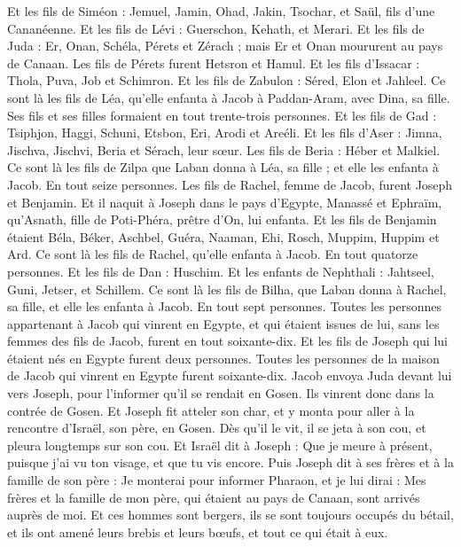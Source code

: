 \begin{multicols}{2}
Et les fils de Siméon : Jemuel, Jamin, Ohad, Jakin, Tsochar, et Saül, fils d'une Cananéenne.
Et les fils de Lévi : Guerschon, Kehath, et Merari.
Et les fils de Juda : Er, Onan, Schéla, Pérets et Zérach ; mais Er et Onan moururent au pays de Canaan. Les fils de Pérets furent Hetsron et Hamul.
Et les fils d'Issacar : Thola, Puva, Job et Schimron.
Et les fils de Zabulon : Séred, Elon et Jahleel.
Ce sont là les fils de Léa, qu'elle enfanta à Jacob à Paddan-Aram, avec Dina, sa fille. Ses fils et ses filles formaient en tout trente-trois personnes.
Et les fils de Gad : Tsiphjon, Haggi, Schuni, Etsbon, Eri, Arodi et Areéli.
Et les fils d'Aser : Jimna, Jischva, Jischvi, Beria et Sérach, leur sœur. Les fils de Beria : Héber et Malkiel.
Ce sont là les fils de Zilpa que Laban donna à Léa, sa fille ; et elle les enfanta à Jacob. En tout seize personnes.
Les fils de Rachel, femme de Jacob, furent Joseph et Benjamin.
Et il naquit à Joseph dans le  pays d'Egypte, Manassé et Ephraïm, qu'Asnath, fille de Poti-Phéra, prêtre d'On, lui enfanta.
Et les fils de Benjamin étaient Béla, Béker, Aschbel, Guéra, Naaman, Ehi, Rosch, Muppim, Huppim et Ard.
Ce sont là les fils de Rachel, qu'elle enfanta à Jacob. En tout quatorze personnes.
Et les fils de Dan : Huschim.
Et les enfants de Nephthali : Jahtseel, Guni, Jetser, et Schillem.
Ce sont là les fils de Bilha, que Laban donna à Rachel, sa fille, et elle les enfanta à Jacob. En tout sept personnes.
Toutes les personnes appartenant à Jacob qui vinrent en Egypte, et qui étaient issues de lui, sans les femmes des fils de Jacob, furent en tout soixante-dix.
Et les fils de Joseph qui lui étaient nés en Egypte furent deux personnes. Toutes les personnes de la maison de Jacob qui vinrent en Egypte furent soixante-dix.
Jacob envoya Juda devant lui vers Joseph, pour l’informer qu’il se rendait en Gosen. Ils vinrent donc dans la contrée de Gosen.
Et Joseph fit atteler son char, et y monta pour aller à la rencontre d'Israël, son père, en Gosen. Dès qu’il le vit, il se jeta à son cou, et pleura longtemps sur son cou.
Et Israël dit à Joseph : Que je meure à présent, puisque j'ai vu ton visage, et que tu vis encore.
Puis Joseph dit à ses frères et à la famille de son père : Je monterai pour informer Pharaon, et je lui dirai : Mes frères et la famille de mon père, qui étaient au pays de Canaan, sont arrivés auprès de moi.
Et ces hommes sont bergers, ils se sont toujours occupés du bétail, et ils ont amené leurs brebis et leurs bœufs, et tout ce qui était à eux.

\end{multicols}

